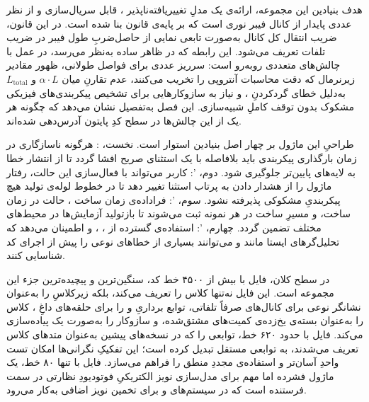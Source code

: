 هدف بنیادین این مجموعه، ارائه‌ی یک مدلِ تغییریافته‌ناپذیر ، قابل سریال‌سازی  و از نظر عددی پایدار از کانال فیبر نوری است که بر پایه‌ی قانون  بنا شده است. در این قانون، ضریب انتقال کل کانال به‌صورت تابعی نمایی از حاصل‌ضربِ طول فیبر در ضریب تلفات تعریف می‌شود. این رابطه که در ظاهر ساده به‌نظر می‌رسد، در عمل با چالش‌های متعددی روبه‌رو است: سرریز عددی  برای فواصل طولانی، ظهور مقادیر زیرنرمال  که دقت محاسبات آنتروپی را تخریب می‌کنند، عدم تقارنِ  میان $\alpha \cdot L$ و $L_{\text{total}}$ به‌دلیل خطای گردکردنِ ، و نیاز به سازوکارهایی برای تشخیص پیکربندی‌های فیزیکی مشکوک  بدون توقف کاملِ شبیه‌سازی. این فصل به‌تفصیل نشان می‌دهد که چگونه هر یک از این چالش‌ها در سطح کدِ پایتون آدرس‌دهی شده‌اند.

طراحیِ این ماژول بر چهار اصل بنیادین استوار است. نخست، : هرگونه ناسازگاری در زمان بارگذاری پیکربندی باید بلافاصله با یک استثنای صریح افشا گردد تا از انتشار خطا به لایه‌های پایین‌تر جلوگیری شود. دوم، ': کاربر می‌تواند با فعال‌سازی این حالت، رفتار ماژول را از هشدار دادن  به پرتاب استثنا  تغییر دهد تا در خطوط لوله‌ی تولید  هیچ پیکربندیِ مشکوکی پذیرفته نشود. سوم، ': فراداده‌ی زمان ساخت ، حالت  در زمان ساخت، و مسیرِ ساخت  در هر نمونه ثبت می‌شوند تا بازتولید آزمایش‌ها در محیط‌های مختلف تضمین گردد. چهارم، ': استفاده‌ی گسترده از ، ،  و  اطمینان می‌دهد که تحلیل‌گرهای ایستا مانند  و  می‌توانند بسیاری از خطاهای نوعی را پیش از اجرای کد شناسایی کنند.

در سطح کلان، فایل  با بیش از ۴۵۰۰ خط کد، سنگین‌ترین و پیچیده‌ترین جزء این مجموعه است. این فایل نه‌تنها کلاس  را تعریف می‌کند، بلکه زیرکلاسِ  را به‌عنوان نشانگر نوعی برای کانال‌های صرفاً تلفاتی، توابع برداریِ  و  را برای حلقه‌های داغِ ، کلاس  را به‌عنوان بسته‌ی یخ‌زده‌ی کمیت‌های مشتق‌شده، و سازوکار  را به‌صورت یک  پیاده‌سازی می‌کند. فایل  با حدود ۶۲۰ خط، توابعی را که در نسخه‌های پیشین به‌عنوان متدهای کلاس تعریف می‌شدند، به توابعی مستقل تبدیل کرده است؛ این تفکیکِ نگرانی‌ها  امکان تست واحدِ آسان‌تر و استفاده‌ی مجددِ منطق را فراهم می‌سازد. فایل  با تنها ۸۰ خط، یک ماژول فشرده اما مهم برای مدل‌سازی نویز الکتریکیِ فوتودیودِ نظارتی در سمت فرستنده است که در سیستم‌های  و  برای تخمین نویز اضافی به‌کار می‌رود.

